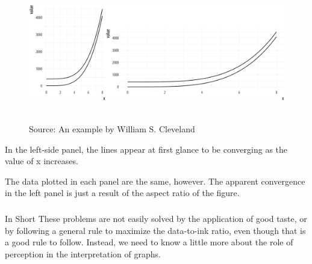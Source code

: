 \documentclass[11pt]{beamer}
\begin{document}

\begin{frame}
	
	\frametitle{\bfseries}
	\begin{figure}
		\vspace{-.5em}
		\includegraphics[width=0.9\linewidth]{Figure/perception-curves-1}
		
		\\
		\tiny{Source: An example by William S. Cleveland}
		\label{fig:anscombe-1}
	\end{figure}
	\begin{itemize}
		\footnotesize{
			\item In the left-side panel, the lines appear at first glance to be converging as the value of x increases.
			\item The data plotted in each panel are the same, however. The apparent convergence in the left panel is just a result of the aspect ratio of the figure. 
		}
	\end{itemize}

\end{frame}

\begin{frame}
	
	\frametitle{\bfseries}
	\begin{block}{In Short}
	These problems are not easily solved by the application of good taste, or by following a general rule to maximize the data-to-ink ratio, even though that is a good rule to follow. Instead, we need to know a little more about the role of perception in the interpretation of graphs. 
	\end{block}

\end{frame}
\end{document}
